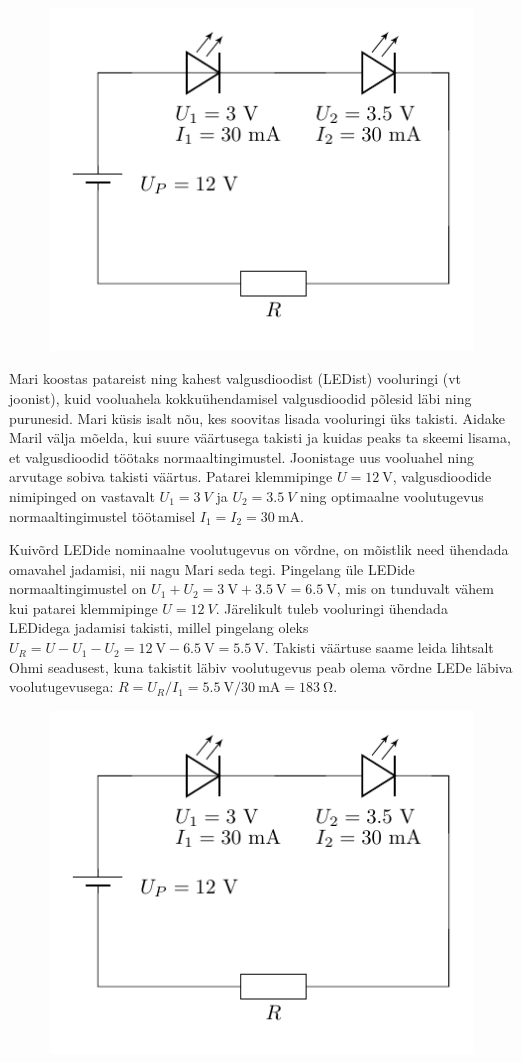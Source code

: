 
\begin{figure}
  \vspace{-30pt}
  \begin{center}
  \includegraphics[scale=0.8]{2024-v2g-03-yl.pdf}
  \vspace{-20pt}
  \end{center}
\end{figure}

Mari koostas patareist ning kahest valgusdioodist (LEDist) vooluringi (vt joonist), kuid vooluahela kokkuühendamisel valgusdioodid põlesid läbi ning purunesid. Mari küsis isalt nõu, kes soovitas lisada vooluringi üks takisti. Aidake Maril välja mõelda, kui suure väärtusega takisti ja kuidas peaks ta skeemi lisama, et valgusdioodid töötaks normaaltingimustel. Joonistage uus vooluahel ning arvutage sobiva takisti väärtus. Patarei klemmipinge $U=\SI{12}{\V}$, valgusdioodide nimipinged on vastavalt $U_1=\SI{3}{V}$ ja $U_2=\SI{3.5}{V}$ ning optimaalne voolutugevus normaaltingimustel töötamisel $I_1=I_2=\SI{30}{\milli\A}$.


\hint

\solu
Kuivõrd LEDide nominaalne voolutugevus on võrdne, on mõistlik need ühendada omavahel jadamisi, nii nagu Mari seda tegi. Pingelang üle LEDide normaaltingimustel on $U_1+U_2=\SI{3}{\V}+\SI{3.5}{\V}=\SI{6.5}{\V}$, mis on tunduvalt vähem kui patarei klemmipinge $U=\SI{12}{V}$. Järelikult tuleb vooluringi ühendada LEDidega jadamisi takisti, millel pingelang oleks $U_R=U-U_1-U_2=\SI{12}{\V}-\SI{6.5}{\V}=\SI{5.5}{\V}$. Takisti väärtuse saame leida lihtsalt Ohmi seadusest, kuna takistit läbiv voolutugevus peab olema võrdne LEDe läbiva voolutugevusega: $R=U_R/I_1=\SI{5.5}{\V}/\SI{30}{\milli\A}=\SI{183}{\ohm}$.

\begin{figure}[h]
    \centering
    \includegraphics[width=0.5\linewidth]{2024-v2g-03-yl.pdf}
\end{figure}
\probend